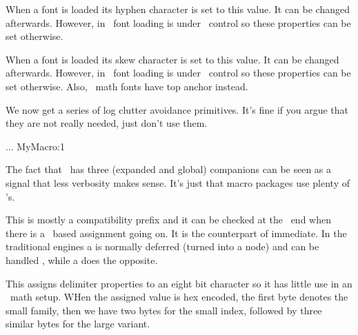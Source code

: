 \startoldprimitive[title={\prm {defaulthyphenchar}}][obsolete=yes]

When a font is loaded its hyphen character is set to this value. It can be
changed afterwards. However, in \LUAMETATEX\ font loading is under \LUA\ control
so these properties can be set otherwise.

\stopoldprimitive

\startoldprimitive[title={\prm {defaultskewchar}}][obsolete=yes]

When a font is loaded its skew character is set to this value. It can be changed
afterwards. However, in \LUAMETATEX\ font loading is under \LUA\ control so these
properties can be set otherwise. Also, \OPENTYPE\ math fonts have top anchor
instead.

\stopoldprimitive

\startnewprimitive[title={\prm {defcsname}}]

We now get a series of log clutter avoidance primitives. It's fine if you argue
that they are not really needed, just don't use them.

\starttyping
\expandafter\def\csname MyMacro:1\endcsname{...}
              MyMacro:1
\stoptyping

The fact that \TEX\ has three (expanded and global) companions can be seen as a
signal that less verbosity makes sense. It's just that macro packages use plenty
of 's.

\stopnewprimitive

\startnewprimitive[title={\prm {deferred}}]

This is mostly a compatibility prefix and it can be checked at the \LUA\ end when
there is a \LUA\ based assignment going on. It is the counterpart of \prm
{immediate}. In the traditional engines a  is normally deferred
(turned into a node) and can be handled , while a 
does the opposite.

\stopnewprimitive

\startoldprimitive[title={\prm {delcode}}][obsolete=yes]

This assigns delimiter properties to an eight bit character so it has little use
in an \OPENTYPE\ math setup. WHen the assigned value is hex encoded, the first
byte denotes the small family, then we have two bytes for the small index,
followed by three similar bytes for the large variant.

\stopoldprimitive

\startoldprimitive[title={\prm {delimiter}}][obsolete=yes]

